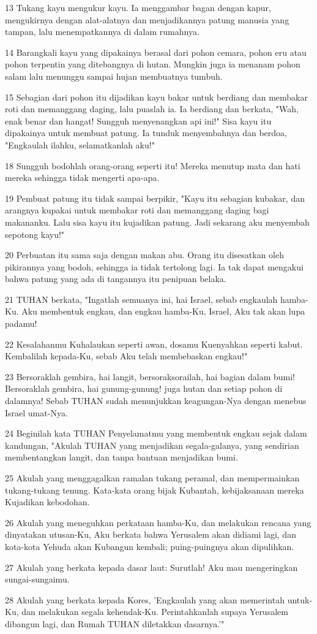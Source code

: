 \par 13 Tukang kayu mengukur kayu. Ia menggambar bagan dengan kapur, mengukirnya dengan alat-alatnya dan menjadikannya patung manusia yang tampan, lalu menempatkannya di dalam rumahnya.
\par 14 Barangkali kayu yang dipakainya berasal dari pohon cemara, pohon eru atau pohon terpentin yang ditebangnya di hutan. Mungkin juga ia menanam pohon salam lalu menunggu sampai hujan membuatnya tumbuh.
\par 15 Sebagian dari pohon itu dijadikan kayu bakar untuk berdiang dan membakar roti dan memanggang daging, lalu puaslah ia. Ia berdiang dan berkata, "Wah, enak benar dan hangat! Sungguh menyenangkan api ini!" Sisa kayu itu dipakainya untuk membuat patung. Ia tunduk menyembahnya dan berdoa, "Engkaulah ilahku, selamatkanlah aku!"
\par 18 Sungguh bodohlah orang-orang seperti itu! Mereka menutup mata dan hati mereka sehingga tidak mengerti apa-apa.
\par 19 Pembuat patung itu tidak sampai berpikir, "Kayu itu sebagian kubakar, dan arangnya kupakai untuk membakar roti dan memanggang daging bagi makananku. Lalu sisa kayu itu kujadikan patung. Jadi sekarang aku menyembah sepotong kayu!"
\par 20 Perbuatan itu sama saja dengan makan abu. Orang itu disesatkan oleh pikirannya yang bodoh, sehingga ia tidak tertolong lagi. Ia tak dapat mengakui bahwa patung yang ada di tangannya itu penipuan belaka.
\par 21 TUHAN berkata, "Ingatlah semuanya ini, hai Israel, sebab engkaulah hamba-Ku. Aku membentuk engkau, dan engkau hamba-Ku, Israel, Aku tak akan lupa padamu!
\par 22 Kesalahanmu Kuhalaukan seperti awan, dosamu Kuenyahkan seperti kabut. Kembalilah kepada-Ku, sebab Aku telah membebaskan engkau!"
\par 23 Bersoraklah gembira, hai langit, bersoraksorailah, hai bagian dalam bumi! Bersoraklah gembira, hai gunung-gunung! juga hutan dan setiap pohon di dalamnya! Sebab TUHAN sudah menunjukkan keagungan-Nya dengan menebus Israel umat-Nya.
\par 24 Beginilah kata TUHAN Penyelamatmu yang membentuk engkau sejak dalam kandungan, "Akulah TUHAN yang menjadikan segala-galanya, yang sendirian membentangkan langit, dan tanpa bantuan menjadikan bumi.
\par 25 Akulah yang menggagalkan ramalan tukang peramal, dan mempermainkan tukang-tukang tenung. Kata-kata orang bijak Kubantah, kebijaksanaan mereka Kujadikan kebodohan.
\par 26 Akulah yang meneguhkan perkataan hamba-Ku, dan melakukan rencana yang dinyatakan utusan-Ku, Aku berkata bahwa Yerusalem akan didiami lagi, dan kota-kota Yehuda akan Kubangun kembali; puing-puingnya akan dipulihkan.
\par 27 Akulah yang berkata kepada dasar laut: Surutlah! Aku mau mengeringkan sungai-sungaimu.
\par 28 Akulah yang berkata kepada Kores, 'Engkaulah yang akan memerintah untuk-Ku, dan melakukan segala kehendak-Ku. Perintahkanlah supaya Yerusalem dibangun lagi, dan Rumah TUHAN diletakkan dasarnya.'"

